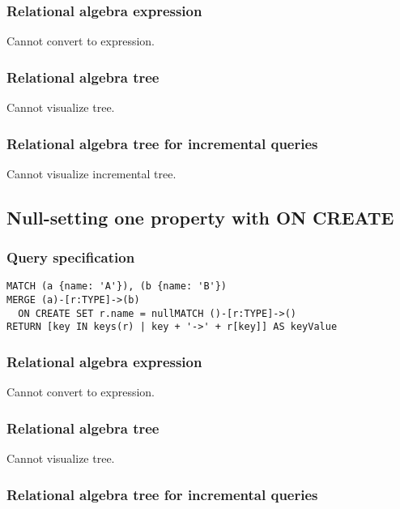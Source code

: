 \subsubsection*{Relational algebra expression}

Cannot convert to expression.

\subsubsection*{Relational algebra tree}

Cannot visualize tree.

\subsubsection*{Relational algebra tree for incremental queries}

Cannot visualize incremental tree.

\subsection{Null-setting one property with ON CREATE}

\subsubsection*{Query specification}

\begin{lstlisting}
MATCH (a {name: 'A'}), (b {name: 'B'})
MERGE (a)-[r:TYPE]->(b)
  ON CREATE SET r.name = nullMATCH ()-[r:TYPE]->()
RETURN [key IN keys(r) | key + '->' + r[key]] AS keyValue
\end{lstlisting}

\subsubsection*{Relational algebra expression}

Cannot convert to expression.

\subsubsection*{Relational algebra tree}

Cannot visualize tree.

\subsubsection*{Relational algebra tree for incremental queries}

